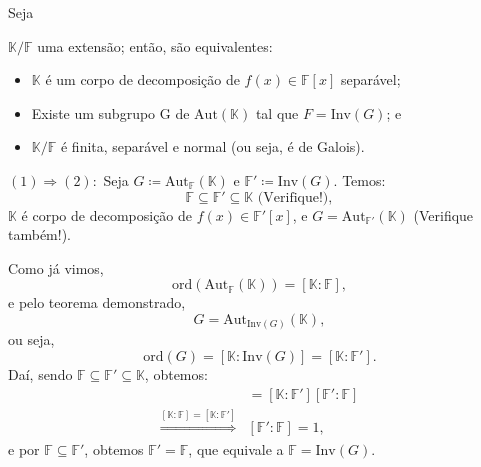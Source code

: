 \documentclass[../algebraIII_notes.tex]{subfiles}
\begin{document}
\begin{theorem*}
	\hypertarget{galois_characterization}{Seja} \(\mathbb{K}/\mathbb{F}\) uma extensão; então, são equivalentes:
	\begin{itemize}
		\item[1)] \(\mathbb{K}\) é um corpo de decomposição de \(f(x)\in \mathbb{F}[x]\) separável;
		\item[2)] Existe um subgrupo G de \(\mathrm{Aut}(\mathbb{K})\) tal que \(F = \mathrm{Inv}(G)\); e
		\item[3)] \(\mathbb{K}/\mathbb{F}\) é finita, separável e normal (ou seja, é de Galois).
	\end{itemize}
\end{theorem*}
\begin{proof*}
	\((1)\Rightarrow (2):\) Seja \(G\coloneqq \mathrm{Aut}_{\mathbb{F}}(\mathbb{K})\) e \(\mathbb{F}'\coloneqq \mathrm{Inv}(G).\) Temos:
	\[
		\mathbb{F}\subseteq \mathbb{F}'\subseteq \mathbb{K} \text{ (Verifique!)},
	\]
	\(\mathbb{K}\) é corpo de decomposição de \(f(x)\in \mathbb{F}'[x]\), e \(G = \mathrm{Aut}_{\mathbb{F}'}(\mathbb{K})\) (Verifique também!).

	Como já vimos,
	\[
		\mathrm{ord}(\mathrm{Aut}_{\mathbb{F}}(\mathbb{K})) = [\mathbb{K}:\mathbb{F}],
	\]
	e pelo teorema demonstrado,
	\[
		G = \mathrm{Aut}_{\mathrm{Inv}(G)}(\mathbb{K}),
	\]
	ou seja,
	\[
		\mathrm{ord}(G) = [\mathbb{K}:\mathrm{Inv}(G)] = [\mathbb{K}:\mathbb{F}'].
	\]
	Daí, sendo \(\mathbb{F}\subseteq \mathbb{F}'\subseteq \mathbb{K}\), obtemos:
	\begin{align*}
		[\mathbb{K}:\mathbb{F}]                                                & = [\mathbb{K}:\mathbb{F}'][\mathbb{F}':\mathbb{F}] \\
		\stackrel{[\mathbb{K}:\mathbb{F}]=[\mathbb{K}:\mathbb{F}']}\Rightarrow & [\mathbb{F}': \mathbb{F}]=1,
	\end{align*}
	e por \(\mathbb{F}\subseteq \mathbb{F}'\), obtemos \(\mathbb{F}' = \mathbb{F}\), que equivale a \(\mathbb{F} = \mathrm{Inv}(G)\).


\end{proof*}
\end{document}
